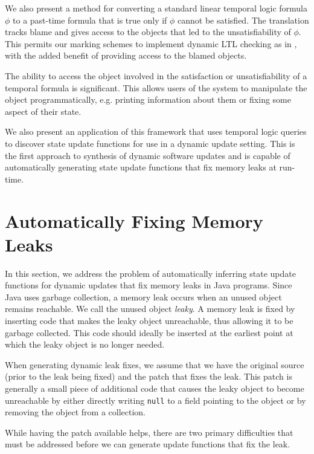 \documentclass[natbib,preprint]{sigplanconf}
\begin{document}
We also present a method for converting a standard linear temporal logic formula
$\phi$ to a past-time formula that is true only if $\phi$ cannot be satisfied.  The
translation tracks blame and gives access to the objects that led to the unsatisfiability of
$\phi$.  This permits our marking schemes to implement dynamic LTL checking as in
\cite{ltl-checking}, with the added benefit of providing access to the blamed objects.

The ability to access the object involved in the satisfaction or unsatisfiability of a
temporal formula is significant.  This allows users of the system to manipulate the
object programmatically, e.g. printing information about them or fixing some aspect of
their state.

We also present an application of this framework that uses temporal logic queries
to discover state update functions for use in a dynamic update setting.  This is the
first approach to synthesis of dynamic software updates and is capable of automatically
generating state update functions that fix memory leaks at run-time.

\section{Automatically Fixing Memory Leaks}

In this section, we address the problem of automatically inferring state
update functions for dynamic updates that fix memory leaks in Java
programs.  Since Java uses garbage collection, a memory leak occurs
when an unused object remains reachable.  We call the unused object
\textit{leaky}.  A memory leak is fixed by inserting code that makes
the leaky object unreachable, thus allowing it to be garbage
collected.  This code should ideally be inserted at the earliest point
at which the leaky object is no longer needed.

When generating dynamic leak fixes, we assume that we have the
original source (prior to the leak being fixed) and the patch that
fixes the leak.  This patch is generally a small piece of additional code
that causes the leaky object to become unreachable by either directly writing
\texttt{null} to a field pointing to the object or by removing the
object from a collection.

While having the patch available helps, there are two primary
difficulties that must be addressed before we can generate update
functions that fix the leak.
\end{document}
